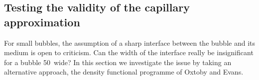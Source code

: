 %
%


\subsection{Testing the validity of the capillary approximation}\label{sec:nuc:DFT}



For small bubbles, the assumption of a sharp interface between the bubble and its medium is open to criticism.
Can the width of the interface really be insignificant for a bubble \unit{50}\nano\metre\ wide?
In this section we investigate the issue by taking an alternative approach,
the density functional programme of Oxtoby and Evans\cite{Oxtoby1988}.


